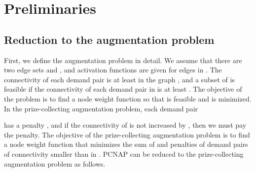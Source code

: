 \documentclass[11pt]{article}
\begin{document}
\section{Preliminaries}\label{sec.preliminaries}

\subsection{Reduction to the augmentation problem}\label{sec.augmentation}
First, we define the augmentation problem in detail.
We assume that there are two edge sets  and , and
activation functions are given for edges in .
The connectivity of each 
demand pair  is at least 
in the graph , 
and a subset  of  is feasible if
the connectivity of each demand pair in
 is at least .
The objective of the problem is to find a node weight function  so that  is feasible and
 is minimized.
In the prize-collecting augmentation problem, each demand pair

has a penalty , and if the connectivity of  is not
increased by , then we
must pay the penalty. The objective of the prize-collecting
augmentation problem is to find a node weight function  that
minimizes the sum of  and penalties of demand pairs of
connectivity smaller than  in .
PCNAP can be reduced to the
prize-collecting augmentation problem as follows.
\end{document}
